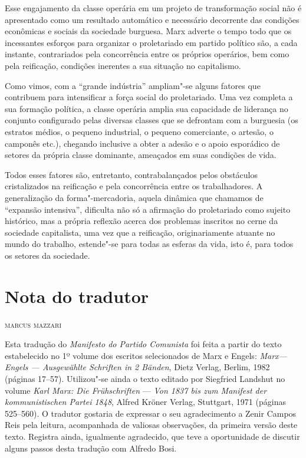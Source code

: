 Esse engajamento da classe operária em um projeto de transformação
social não é apresentado como um resultado automático e necessário
decorrente das condições econômicas e sociais da sociedade burguesa.
Marx adverte o tempo todo que os incessantes esforços para organizar o
proletariado em partido político são, a cada instante, contrariados
pela concorrência entre os próprios operários, bem como pela reificação,
condições inerentes a sua situação no capitalismo.

Como vimos, com a “grande indústria” ampliam"-se alguns fatores que
contribuem para intensificar a força social do proletariado. Uma vez
completa a sua formação política, a classe operária amplia sua
capacidade de liderança no conjunto configurado pelas diversas classes
que se defrontam com a burguesia (os estratos médios, o pequeno
industrial, o pequeno comerciante, o artesão, o camponês etc.), chegando
inclusive a obter a adesão e o apoio esporádico de setores da própria
classe dominante, ameaçados em suas condições de vida. 

Todos esses fatores são, entretanto, contrabalançados pelos obstáculos
cristalizados na reificação e pela concorrência entre os trabalhadores.
A generalização da forma"-mercadoria, aquela dinâmica que chamamos de
“expansão intensiva”, dificulta não só a afirmação do proletariado como
sujeito histórico, mas a própria reflexão acerca dos problemas
inscritos no cerne da sociedade capitalista, uma vez que a reificação,
originariamente atuante no mundo do trabalho, estende"-se para todas
as esferas da vida, isto é, para todos os setores da sociedade.

\chapter{Nota do tradutor}

\begin{flushright}
\textsc{marcus mazzari }
\end{flushright}

\noindent{}Esta tradução do \textit{Manifesto do Partido Comunista} foi feita a
partir do texto estabelecido no 1º volume dos escritos selecionados de
Marx e Engels: \textit{Marx---Engels --- Ausgewählte Schriften in 2
Bänden}, Dietz Verlag, Berlim, 1982 (páginas 17--57). Utilizou"-se
ainda o texto editado por Siegfried Landshut no volume \textit{Karl
Marx: Die  Frühschriften} --- \textit{Von 1837 bis zum Manifest der
kommunistischen Partei 1848}, Alfred Kröner Verlag, Stuttgart, 1971
(páginas 525--560). O tradutor gostaria de expressar o seu
agradecimento a Zenir Campos Reis pela leitura, acompanhada de valiosas
observações, da primeira versão deste texto. Registra ainda, igualmente
agradecido, que teve a oportunidade de discutir alguns passos desta
tradução com Alfredo Bosi.




